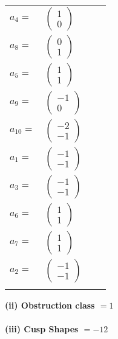 \documentclass[1p]{elsarticle_modified}
\theoremstyle{definition}
\begin{document}
\begin{tabular}{m{7pt} m{180pt} m{7pt} m{180pt} }
\flushright $a_{4}=$&$\begin{pmatrix}1\\0\end{pmatrix}$ \\
\flushright $a_{8}=$&$\begin{pmatrix}0\\1\end{pmatrix}$ \\
\flushright $a_{5}=$&$\begin{pmatrix}1\\1\end{pmatrix}$ \\
\flushright $a_{9}=$&$\begin{pmatrix}-1\\0\end{pmatrix}$ \\
\flushright $a_{10}=$&$\begin{pmatrix}-2\\-1\end{pmatrix}$ \\
\flushright $a_{1}=$&$\begin{pmatrix}-1\\-1\end{pmatrix}$ \\
\flushright $a_{3}=$&$\begin{pmatrix}-1\\-1\end{pmatrix}$ \\
\flushright $a_{6}=$&$\begin{pmatrix}1\\1\end{pmatrix}$ \\
\flushright $a_{7}=$&$\begin{pmatrix}1\\1\end{pmatrix}$ \\
\flushright $a_{2}=$&$\begin{pmatrix}-1\\-1\end{pmatrix}$\\&\end{tabular}
\flushleft \textbf{(ii) Obstruction class $= 1$}\\~\\
\flushleft \textbf{(iii) Cusp Shapes $= -12$}\\~\\
\end{document}
